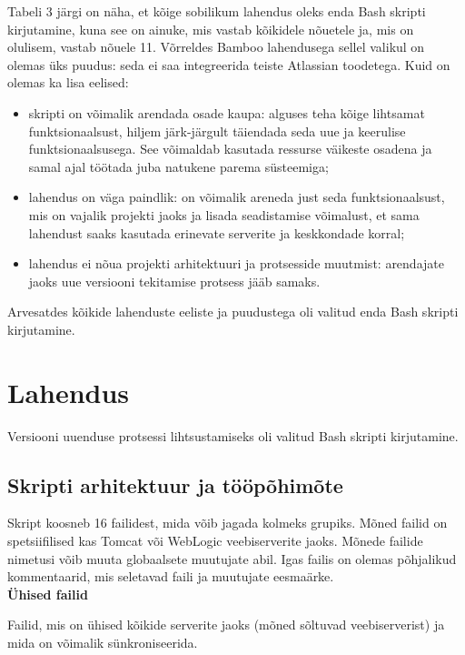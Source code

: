 \documentclass[12pt]{report}
\begin{document}
  Tabeli 3 järgi on näha, et kõige sobilikum lahendus oleks enda Bash skripti kirjutamine, kuna see on ainuke, mis vastab kõikidele nõuetele ja, mis on olulisem, vastab nõuele 11. Võrreldes Bamboo lahendusega sellel valikul on olemas üks puudus: seda ei saa integreerida teiste Atlassian toodetega. Kuid on olemas ka lisa eelised:
  \begin{itemize}
    \item skripti on võimalik arendada osade kaupa: alguses teha kõige lihtsamat funktsionaalsust, hiljem järk-järgult täiendada seda uue ja keerulise funktsionaalsusega. See võimaldab kasutada ressurse väikeste osadena ja samal ajal töötada juba natukene parema süsteemiga;
    \item lahendus on väga paindlik: on võimalik areneda just seda funktsionaalsust, mis on vajalik projekti jaoks ja lisada seadistamise võimalust, et sama lahendust saaks kasutada erinevate serverite ja keskkondade korral;
    \item lahendus ei nõua projekti arhitektuuri ja protsesside muutmist: arendajate jaoks uue versiooni tekitamise protsess jääb samaks.
  \end{itemize}
  
  Arvesatdes kõikide lahenduste eeliste ja puudustega oli valitud enda Bash skripti kirjutamine.
  
  \newpage
  
  \section{Lahendus}
  
  Versiooni uuenduse protsessi lihtsustamiseks oli valitud Bash skripti kirjutamine.
  
  \subsection{Skripti arhitektuur ja tööpõhimõte}
  
  Skript koosneb 16 failidest, mida võib jagada kolmeks grupiks. Mõned failid on spetsiifilised kas Tomcat või WebLogic veebiserverite jaoks. Mõnede failide nimetusi võib muuta globaalsete muutujate abil. Igas failis on olemas põhjalikud kommentaarid, mis seletavad faili ja muutujate eesmaärke.\\

  \textbf{Ühised failid}
  
  Failid, mis on ühised kõikide serverite jaoks (mõned sõltuvad veebiserverist) ja mida on võimalik sünkroniseerida.
  
\end{document}
